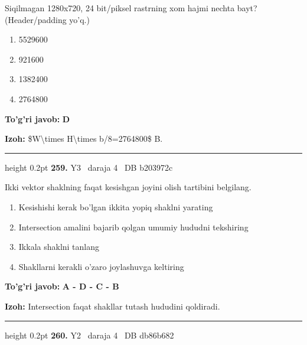 \documentclass[10pt,a4paper,oneside]{article}
\begin{document}
\par
Siqilmagan 1280x720, 24 bit/piksel rastrning xom hajmi nechta bayt? (Header/padding yo'q.)
\begin{enumerate}[label=\Alph*),leftmargin=9mm]
\item 5529600
\item 921600
\item 1382400
\item 2764800
\end{enumerate}
\begin{tcolorbox}[enhanced,breakable,colback=teal!4,colframe=teal!45!black,boxrule=0.45pt,arc=1.2mm,left=2.8mm,right=2.8mm,top=2mm,bottom=2mm,before skip=2mm,after skip=2mm]
\textbf{\color{teal}To'g'ri javob:} \textbf{D}
\par\smallskip
\textbf{Izoh:} \$W\textbackslash{}times H\textbackslash{}times b/8=2764800\$ B.
\end{tcolorbox}
\vspace{2mm}\hrule height 0.2pt \vspace{4mm}
\hypertarget{q259}{\textbf{\color{ink}259.}}  {\color{muted}\scriptsize Y3 \textbullet\ daraja 4 \textbullet\ DB b203972c}
\par
Ikki vektor shaklning faqat kesishgan joyini olish tartibini belgilang.
\begin{enumerate}[label=\Alph*),leftmargin=9mm]
\item Kesishishi kerak bo'lgan ikkita yopiq shaklni yarating
\item Intersection amalini bajarib qolgan umumiy hududni tekshiring
\item Ikkala shaklni tanlang
\item Shakllarni kerakli o'zaro joylashuvga keltiring
\end{enumerate}
\begin{tcolorbox}[enhanced,breakable,colback=teal!4,colframe=teal!45!black,boxrule=0.45pt,arc=1.2mm,left=2.8mm,right=2.8mm,top=2mm,bottom=2mm,before skip=2mm,after skip=2mm]
\textbf{\color{teal}To'g'ri javob:} \textbf{A - D - C - B}
\par\smallskip
\textbf{Izoh:} Intersection faqat shakllar tutash hududini qoldiradi.
\end{tcolorbox}
\vspace{2mm}\hrule height 0.2pt \vspace{4mm}
\hypertarget{q260}{\textbf{\color{ink}260.}}  {\color{muted}\scriptsize Y2 \textbullet\ daraja 4 \textbullet\ DB db86b682}
\par
\end{document}
